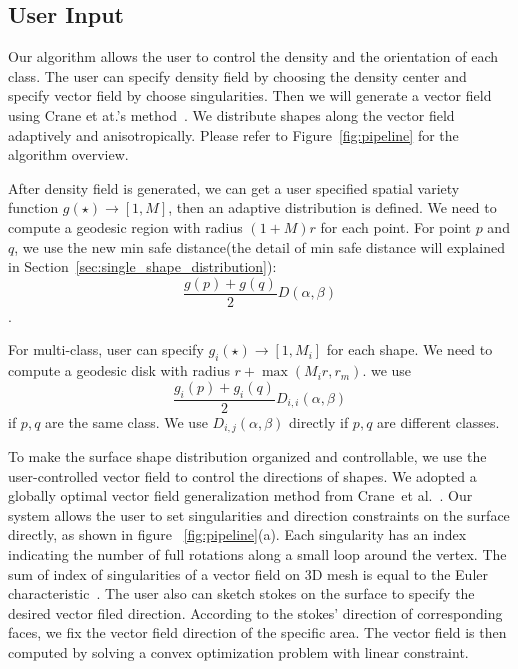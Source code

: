 \subsection{User Input}

Our algorithm allows the user to control the density and the orientation of each class. The user can specify density field by choosing the density center and specify vector field by choose singularities. Then we will generate a vector field using Crane et at.'s method~\cite{crane2010trivial}. We distribute shapes along the vector field adaptively and anisotropically. Please refer to Figure~\ref{fig:pipeline} for the algorithm overview.

After density field is generated, we can get a user specified spatial variety function $g(\star)\rightarrow [1, M]$, then an adaptive distribution is defined. We need to compute a geodesic region with radius $(1+M)r$ for each point. For
point $p$ and $q$, we use the new min safe distance(the detail of min safe distance will explained in Section~\ref{sec:single_shape_distribution}):
\[ \frac{g(p) + g(q)}{2}D(\alpha, \beta) \].

For multi-class, user can specify $g_i(\star) \rightarrow [1, M_i]$
for each shape. We need to compute a geodesic disk with radius $r +
\max(M_ir, r_m)$. we use \[ \frac{g_i(p) + g_i(q)}{2}D_{i,i}(\alpha,
\beta) \]  if $p,q$ are the same class. We use $D_{i,j}(\alpha,
\beta)$ directly if $p, q$ are different classes.

To make the surface shape distribution organized and controllable, we use the user-controlled vector field to control the directions of shapes. We adopted a globally optimal vector field generalization method from Crane~et al.~\cite{crane2010trivial}. Our system allows the user to set singularities and direction constraints on the surface directly, as shown in figure ~\ref{fig:pipeline}(a). Each singularity has an index indicating the number of full rotations along a small loop around the vertex. The sum of index of singularities of a vector field on 3D mesh is equal to the Euler characteristic~\cite{crane2010trivial}. The user also can sketch stokes on the surface to specify the desired vector filed direction. According to the stokes' direction of corresponding faces, we fix the vector field direction of the specific area. The vector field is then computed by solving a convex optimization problem with linear constraint.

